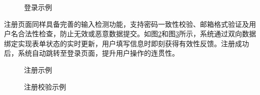 \documentclass[UTF8,a4paper,12pt]{ctexart}
\numberwithin{equation}{section}
\begin{document}
\begin{figure}[H]
	\caption{登录示例}
	\label{loginpage}
\end{figure}
注册页面同样具备完善的输入检测功能，支持密码一致性校验、邮箱格式验证及用户名合法性检查，防止无效或恶意数据提交。如图\ref{registerpage}和图\ref{registercheckpage}所示，系统通过双向数据绑定实现表单状态的实时更新，用户填写信息时即刻获得有效性反馈。注册成功后，系统自动跳转至登录页面，提升用户操作的连贯性。
\begin{figure}[H]
	\caption{注册示例}
	\label{registerpage}
\end{figure}
\begin{figure}[H]
	\caption{注册校验示例}
	\label{registercheckpage}
\end{figure}
\end{document}
